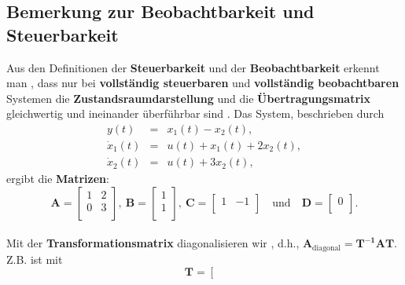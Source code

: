 {\subsection{Bemerkung zur Beobachtbarkeit und Steuerbarkeit} 
Aus den Definitionen der {\bf Steuerbarkeit} und
der {\bf Beobachtbarkeit} erkennt man
\cite{UNB:89}, dass nur bei {\bf vollst\"andig steuerbaren} und {\bf
   vollst\"andig beobachtbaren} Systemen die {\bf Zustandsraumdarstellung} und die
{\bf
  \"Ubertragungsmatrix}
 gleichwertig und ineinander \"uberf\"uhrbar sind
\cite{UNB:89}.
Das System, beschrieben durch
\begin{eqnarray*}%
 y(t) &=& x_1(t) -x_2(t),\\
  \dot{x}_1(t)&=&u(t)+x_1(t)+2x_2(t),\\
  \dot{x}_2(t)&=&u(t)+3x_2(t),
\end{eqnarray*}
\vspace*{-3mm}ergibt die {\bf Matrizen}:
\begin{equation*}
\boldsymbol{A}=\left [
\begin{array}{cc}
 1 & 2\\
 0 & 3\\
\end{array}
\right ],~
\boldsymbol{B}=\left [
\begin{array}{c}
 1 \\
 1\\
\end{array}
\right ],~
\boldsymbol{C}=\left [
\begin{array}{cc}
 1 & -1\\
\end{array}
\right ]\quad
\text{und}\quad
\boldsymbol{D}=\left [
\begin{array}{c}
 0\\
\end{array}
\right ].\end{equation*}\\ 
Mit der {\bf Transformationsmatrix}  diagonalisieren wir , d.h., $\boldsymbol{A}_\text{diagonal}=\boldsymbol{T^{-1}AT}$. Z.B. ist mit \\
\begin{equation*}
\boldsymbol{T}=\left [
\begin{array}{cc}

\end{array}
\end{equation*}}

